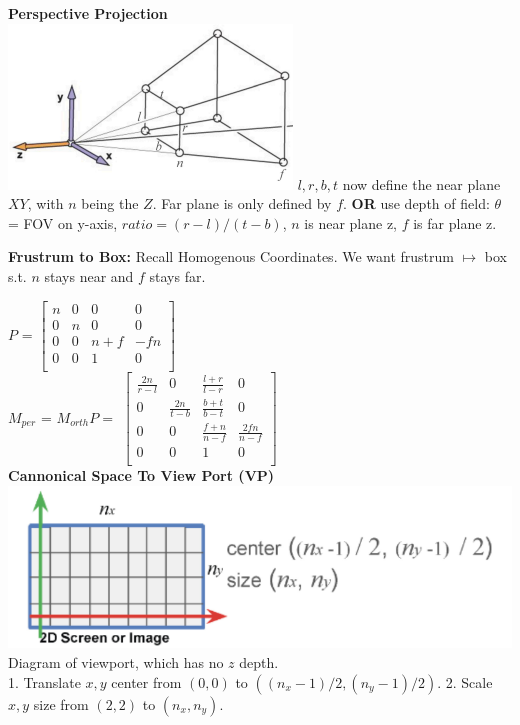 \documentclass[letterpaper, 8pt]{extarticle}
\begin{document}
\begin{multicols*}{4}
\textbf{Perspective Projection}\\
\includegraphics[width=.5\linewidth]{cam-persp.png}
$l,r,b,t$ now define the near plane $XY$, with $n$ being the $Z$. Far plane is only defined by $f$.
\textbf{OR} use depth of field:
$\theta$ = FOV on y-axis, $ratio = (r-l)/(t-b)$, $n$ is near plane z, $f$ is far plane z.

\textbf{Frustrum to Box:}
Recall Homogenous Coordinates. We want frustrum $\mapsto$ box s.t. $n$ stays near and $f$ stays far.

$P$ =
\(
\begin{bmatrix}
    n & 0 & 0   & 0   \\
    0 & n & 0   & 0   \\
    0 & 0 & n+f & -fn \\
    0 & 0 & 1   & 0   \\
\end{bmatrix}
\)\\
$M_{per}$ = $M_{orth}P =$
\(
\begin{bmatrix}
    \frac{2n}{r-l} & 0              & \frac{l+r}{l-r} & 0               \\
    0              & \frac{2n}{t-b} & \frac{b+t}{b-t} & 0               \\
    0              & 0              & \frac{f+n}{n-f} & \frac{2fn}{n-f} \\
    0              & 0              & 1               & 0               \\
\end{bmatrix}
\)\\

\textbf{Cannonical Space To View Port (VP)}\\

\includegraphics[width=\linewidth]{viewport-diagram.png}
Diagram of viewport, which has no $z$ depth.\\
1. Translate $x,y$ center from $(0,0)$ to $((n_x-1)/2, (n_y-1)/2)$.
2. Scale $x,y$ size from $(2,2)$ to $(n_x, n_y)$.


\end{multicols*}
\end{document}
